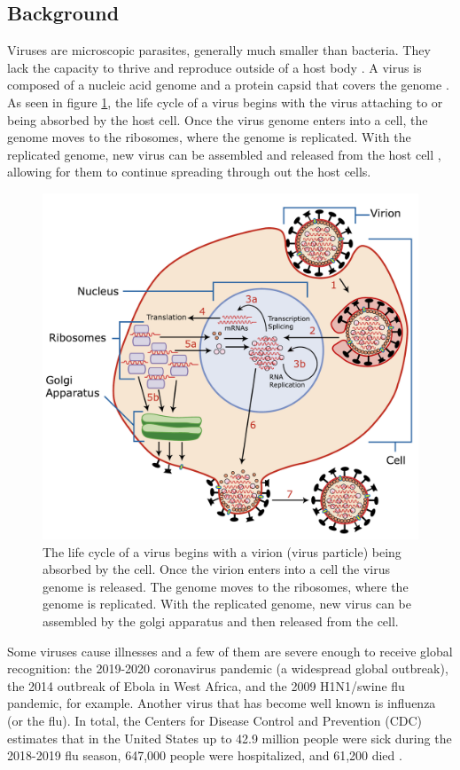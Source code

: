 \documentclass[a4paper]{article}
\begin{document}
\subsection{Background}
Viruses are microscopic parasites, generally much smaller than bacteria. They lack the capacity to thrive and reproduce outside of a host body \cite{website2}. A virus is composed of a nucleic acid genome and a protein capsid that covers the genome \cite{website3}. As seen in figure \ref{fig:Virus_Replication}, the life cycle of a virus begins with the virus attaching to or being absorbed by the host cell. Once the virus genome enters into a cell, the genome moves to the ribosomes, where the genome is replicated. With the replicated genome, new virus can be assembled and released from the host cell \cite{Kaiser}, allowing for them to continue spreading through out the host cells.

\begin{figure}[h]
    \centering
    \includegraphics[width=0.6\linewidth]{Figures/Virus_Replication_large.pdf}
    \caption{The life cycle of a virus begins with a virion (virus particle) being absorbed by the cell. Once the virion enters into a cell the virus genome is released. The genome moves to the ribosomes, where the genome is replicated. With the replicated genome, new virus can be assembled by the golgi apparatus and then released from the cell.}
    \label{fig:Virus_Replication}
\end{figure}

Some viruses cause illnesses and a few of them are severe enough to receive global recognition: the 2019-2020 coronavirus pandemic (a widespread global outbreak), the 2014 outbreak of Ebola in West Africa, and the 2009 H1N1/swine flu pandemic, for example. Another virus that has become well known is influenza (or the flu). In total, the Centers for Disease Control and Prevention (CDC) estimates that in the United States up to 42.9 million people were sick during the 2018-2019 flu season, 647,000 people were hospitalized, and 61,200 died \cite{website4}.
\end{document}
